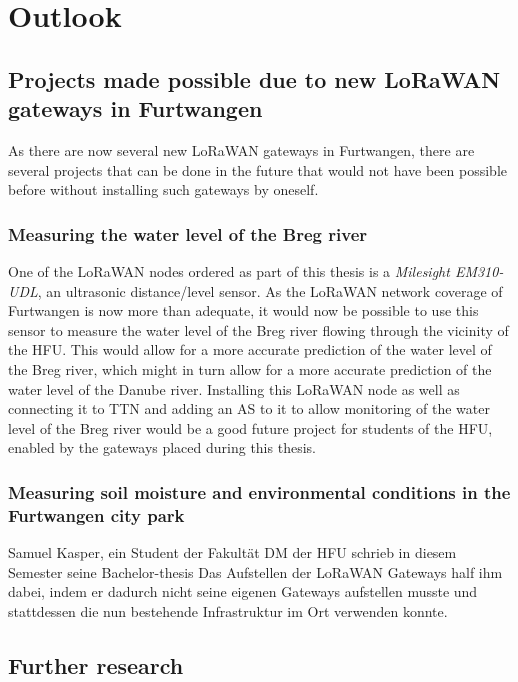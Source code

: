 
\section{Outlook}


\subsection{Projects made possible due to new \acs{LoRaWAN} gateways in Furtwangen}

As there are now several new \ac{LoRaWAN} gateways in Furtwangen, there are several projects that can be done in the future that would not have been possible before without installing such gateways by oneself.

\subsubsection{Measuring the water level of the Breg river}

One of the \ac{LoRaWAN} nodes ordered as part of this thesis is a \emph{Milesight EM310-UDL}, an ultrasonic distance/level sensor.
As the \ac{LoRaWAN} network coverage of Furtwangen is now more than adequate, it would now be possible to use this sensor to measure the water level of the Breg river flowing through the vicinity of the \ac{HFU}.
This would allow for a more accurate prediction of the water level of the Breg river, which might in turn allow for a more accurate prediction of the water level of the Danube river.
Installing this \ac{LoRaWAN} node as well as connecting it to \ac{TTN} and adding an \acf{AS} to it to allow monitoring of the water level of the Breg river would be a good future project for students of the \ac{HFU}, enabled by the gateways placed during this thesis.

\subsubsection{Measuring soil moisture and environmental conditions in the Furtwangen city park}

Samuel Kasper, ein Student der Fakultät \ac{DM} der \ac{HFU} schrieb in diesem Semester seine Bachelor-thesis
Das Aufstellen der \ac{LoRaWAN} Gateways half ihm dabei, indem er dadurch nicht seine eigenen Gateways aufstellen musste und stattdessen die nun bestehende Infrastruktur im Ort verwenden konnte.

\subsection{Further research}

